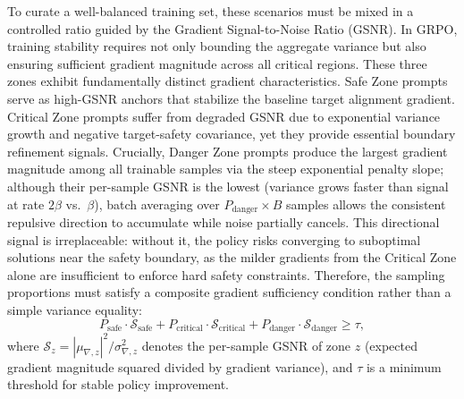 To curate a well-balanced training set, these scenarios must be mixed in a controlled ratio guided by the Gradient Signal-to-Noise Ratio (GSNR). In GRPO, training stability requires not only bounding the aggregate variance but also ensuring sufficient gradient magnitude across all critical regions. 
These three zones exhibit fundamentally distinct gradient characteristics. Safe Zone prompts serve as high-GSNR anchors that stabilize the baseline target alignment gradient. Critical Zone prompts suffer from degraded GSNR due to exponential variance growth and negative target-safety covariance, yet they provide essential boundary refinement signals. Crucially, Danger Zone prompts produce the largest gradient magnitude among all trainable samples via the steep exponential penalty slope; although their per-sample GSNR is the lowest (variance grows faster than signal at rate $2\beta$ vs.\ $\beta$), batch averaging over $P_{\mathrm{danger}} \times B$ samples allows the consistent repulsive direction to accumulate while noise partially cancels. This directional signal is irreplaceable: without it, the policy risks converging to suboptimal solutions near the safety boundary, as the milder gradients from the Critical Zone alone are insufficient to enforce hard safety constraints.
Therefore, the sampling proportions must satisfy a composite gradient sufficiency condition rather than a simple variance equality:
\begin{equation}
    P_{\mathrm{safe}} \cdot \mathcal{S}_{\mathrm{safe}} + P_{\mathrm{critical}} \cdot \mathcal{S}_{\mathrm{critical}} + P_{\mathrm{danger}} \cdot \mathcal{S}_{\mathrm{danger}} \geq \tau,
    \label{eq:composite_gradient}
\end{equation}
where $\mathcal{S}_z = |\mu_{\nabla,z}|^2 / \sigma_{\nabla,z}^2$ denotes the per-sample GSNR of zone $z$ (expected gradient magnitude squared divided by gradient variance), and $\tau$ is a minimum threshold for stable policy improvement. 

